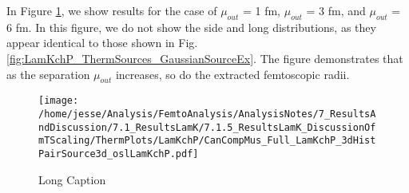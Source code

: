 \documentclass[/home/jesse/Analysis/FemtoAnalysis/AnalysisNotes/AnalysisNoteJBuxton.tex]{subfiles}
\begin{document}
In Figure \ref{fig:LamKchP_ThermSources_VaryMuOut}, we show results for the case of $\mu_{out}$ = 1 fm, $\mu_{out}$ = 3 fm, and $\mu_{out}$ = 6 fm.
In this figure, we do not show the side and long distributions, as they appear identical to those shown in Fig. \ref{fig:LamKchP_ThermSources_GaussianSourceEx}.
The figure demonstrates that as the separation $\mu_{out}$ increases, so do the extracted femtoscopic radii.



\begin{figure}[h]
  \centering
  \texttt{[image: /home/jesse/Analysis/FemtoAnalysis/AnalysisNotes/7\_ResultsAndDiscussion/7.1\_ResultsLamK/7.1.5\_ResultsLamK\_DiscussionOfmTScaling/ThermPlots/LamKchP/CanCompMus\_Full\_LamKchP\_3dHistPairSource3d\_oslLamKchP.pdf]}
  \caption[Short Caption]{Long Caption}
  \label{fig:LamKchP_ThermSources_VaryMuOut}
\end{figure}

















\clearpage
\end{document}
